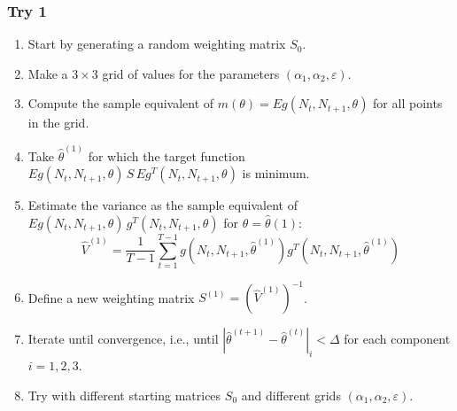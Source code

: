     \subsubsection{Try 1}
    \begin{enumerate}
        \item Start by generating a random weighting matrix $S_0$.
        \item Make a $3\times 3$ grid of values for the parameters $(\alpha_1, \alpha_2, \varepsilon)$.
        \item Compute the sample equivalent of $m(\theta)=E g(N_t, N_{t+1}, \theta)$ for all points in the grid.
        \item Take $\hat \theta^{(1)}$ for which the target function $E g(N_t, N_{t+1}, \theta)  \, S \, E g^T(N_t, N_{t+1}, \theta)$ is minimum.
        \item Estimate the variance as the sample equivalent of $E g(N_t, N_{t+1}, \theta)  \, g^T(N_t, N_{t+1}, \theta)$ for $\theta = \hat \theta(1)$:
        \begin{equation}
            \hat V^{(1)}  = \frac{1}{T-1} \sum_{t=1}^{T-1} g(N_t, N_{t+1}, \hat \theta^{(1)}) g^T(N_t, N_{t+1}, \hat \theta^{(1)})
        \end{equation}
        \item Define a new weighting matrix $S^{(1)} = \left( \hat V^{(1)} \right)^{-1}$.
        \item Iterate until convergence, i.e., until $\left \vert \hat \theta^{(t+1)} - \hat \theta^{(t)} \right \vert_{i} < \Delta$ for each component $i=1,2,3$.
        \item Try with different starting matrices $S_0$ and different grids $(\alpha_1, \alpha_2, \varepsilon)$.
    \end{enumerate}
